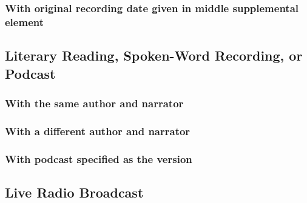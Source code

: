 \documentclass{article}
\begin{document}
\subsubsection{With original recording date given in middle supplemental element} %
\label{ssub:with_original_recording_date_given_in_middle_supplemental_element}
\begin{refsection}
	\printbibliography[heading=none]
\end{refsection}
\subsection{Literary Reading, Spoken-Word Recording, or Podcast} %
\label{sub:literary_reading_spoken_word_recording_or_podcast}
\subsubsection{With the same author and narrator} %
\label{ssub:with_the_same_author_and_narrator}
\begin{refsection}
	\printbibliography[heading=none]
\end{refsection}
\subsubsection{With a different author and narrator} %
\label{ssub:with_a_different_author_and_narrator}
\begin{refsection}
	\printbibliography[heading=none]
\end{refsection}
\subsubsection{With podcast specified as the version} %
\label{ssub:with_podcast_specified_as_the_version}
\begin{refsection}
	\printbibliography[heading=none]
\end{refsection}
\subsection{Live Radio Broadcast} %
\label{sub:live_radio_broadcast}
\begin{refsection}
	\printbibliography[heading=none]
\end{refsection}
\end{document}
